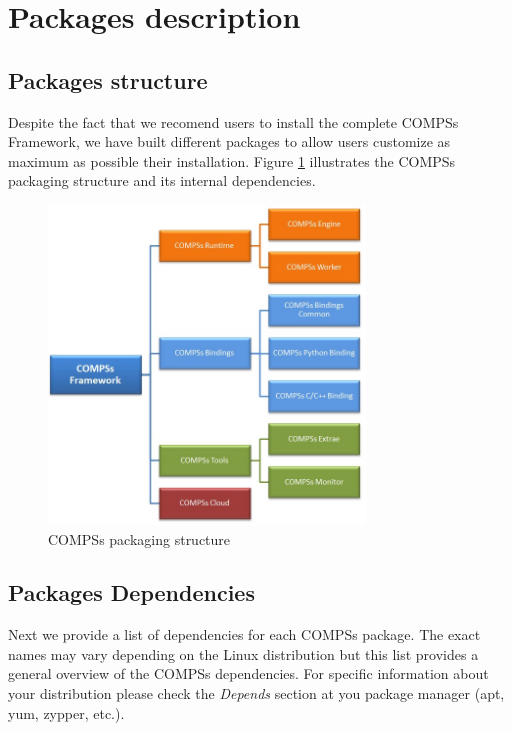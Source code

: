 \section{Packages description}
\label{sec:Packages}


\subsection{Packages structure}
Despite the fact that we recomend users to install the complete COMPSs Framework, we have built different packages to allow users
customize as maximum as possible their installation. Figure \ref{fig:compss_packages_debian} illustrates the COMPSs 
packaging structure and its internal dependencies. 
\begin{figure}[ht!]
  \centering
    \includegraphics[width=0.75\textwidth]{./Sections/2_Packages_Description/Figures/compss_packages.jpeg}
    \caption{COMPSs packaging structure}
    \label{fig:compss_packages_debian}
\end{figure}

\newpage

\subsection{Packages Dependencies}
Next we provide a list of dependencies for each COMPSs package. The exact names may vary depending on 
the Linux distribution but this list provides a general overview of the COMPSs dependencies. For specific information about
your distribution please check the \textit{Depends} section at you package manager (apt, yum, zypper, etc.).

